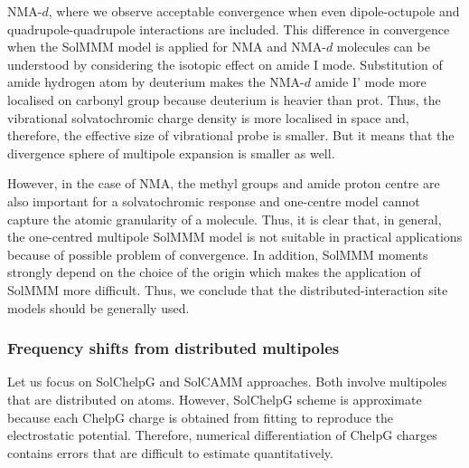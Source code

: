 \documentclass[b5paper,oneside,fleqn,11pt]{book}
\begin{document}
\begin{refsection}
NMA-$d$, where we observe acceptable convergence when
even dipole\hyp{}octupole and quadrupole\hyp{}quadrupole
interactions are included.
This difference in convergence
when the SolMMM model is applied for NMA and
NMA-$d$ molecules can be understood by considering the isotopic
effect on amide I mode. Substitution of amide hydrogen
atom by deuterium makes the NMA-$d$ amide I' mode more localised
on carbonyl group because deuterium is heavier than prot. 
Thus, the vibrational solvatochromic charge
density is more localised in space and, therefore, the effective
size of vibrational probe is smaller. 
But it means that the divergence sphere
of multipole expansion is smaller as well. 

However, in the case of NMA,
the methyl groups and amide proton centre are also important for a solvatochromic
response and one\hyp{}centre model cannot capture the atomic
granularity of a molecule. Thus, it is clear that, in general,
the one\hyp{}centred multipole SolMMM model is not suitable in
practical applications because of possible problem of convergence.
In addition, SolMMM moments strongly depend on the choice of the
origin \citep{Lee.Choi.Cho.JCP.2012} which makes the application
of SolMMM more difficult.
Thus, we conclude that the distributed\hyp{}interaction site
models should be generally used.

\subsubsection{Frequency shifts from distributed multipoles}

Let us focus on SolChelpG and SolCAMM approaches. Both involve multipoles
that are distributed on atoms. However, SolChelpG scheme is approximate
because each ChelpG charge is obtained from fitting to reproduce the electrostatic
potential. Therefore, numerical differentiation of ChelpG charges
contains errors that are difficult to estimate quantitatively.


\end{refsection}
\end{document}
